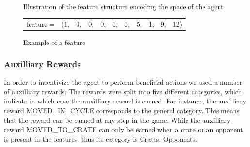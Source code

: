 \documentclass[
	letterpaper, %
	10pt, %
]{CSUniSchoolLabReport}
\begin{document}
\begin{center}
	\begin{figure}[H]
		\caption{Illustration of the feature structure encoding the space of the agent}
	\end{figure}
\end{center}


\begin{center}
	\begin{figure}[h]
		\centering
		\begin{tabular}{ccccccccccc}
			feature = & (1, & 0, & 0, & 0, & 1, & 1, & 5, & 1, & 9, & 12)
		\end{tabular}
		\caption{Example of a feature }
		\label{fig:example}
	\end{figure}
\end{center}



\subsubsection*{Auxilliary Rewards}
In order to incentivize the agent to perform beneficial actions we used a number of auxilliary rewards.
The rewards were split into five different categories, which indicate in which case the auxilliary reward
is earned. For instance, the auxilliary reward MOVED\_IN\_CYCLE corresponds to the general category. This
means that the reward can be earned at any step in the game. While the auxilliary reward MOVED\_TO\_CRATE can
only be earned when a crate or an opponent is present in the features, thus its category is Crates, Opponents.
\end{document}
